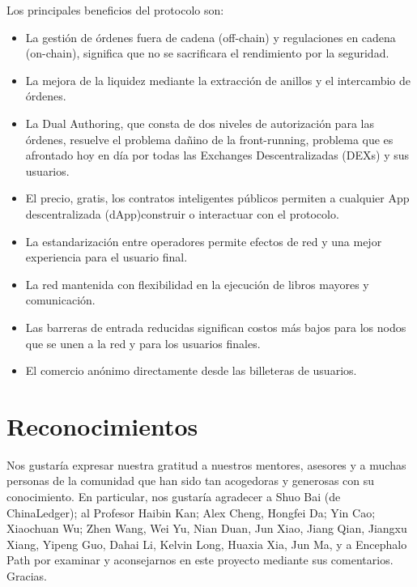 \documentclass[UTF8,nofonts]{article}
\begin{document}
\begin{multicols}{2}
Los principales beneficios del protocolo son:
\begin{itemize}
	\item La gesti\'on de \'ordenes fuera de cadena (off-chain) y regulaciones en cadena (on-chain), significa que no se sacrificara el rendimiento por la seguridad.
	\item La mejora de la liquidez mediante la extracci\'on de anillos y el intercambio de \'ordenes.
	\item La Dual Authoring, que consta de dos niveles de autorizaci\'on para las \'ordenes, resuelve el problema da\~nino de la front-running, problema que es afrontado hoy en d\'ia por todas las Exchanges Descentralizadas (DEXs) y sus usuarios.
	\item El precio, gratis, los contratos inteligentes p\'ublicos permiten a cualquier App descentralizada (dApp)construir o interactuar con el protocolo.
	\item La estandarizaci\'on entre operadores permite efectos de red y una mejor experiencia para el usuario final.
	\item La red mantenida con flexibilidad en la ejecuci\'on de libros mayores y comunicaci\'on.
	\item Las barreras de entrada reducidas significan costos m\'as bajos para los nodos que se unen a la red y para los usuarios finales.
	\item El comercio an\'onimo directamente desde las billeteras de usuarios.
\end{itemize}


\section{Reconocimientos}
Nos gustar\'ia expresar nuestra gratitud a nuestros mentores, asesores y a muchas personas de la comunidad que han sido tan acogedoras y generosas con su conocimiento. En particular, nos gustar\'ia agradecer a Shuo Bai (de ChinaLedger); al Profesor Haibin Kan; Alex Cheng, Hongfei Da; Yin Cao; Xiaochuan Wu; Zhen Wang, Wei Yu, Nian Duan, Jun Xiao, Jiang Qian, Jiangxu Xiang, Yipeng Guo, Dahai Li, Kelvin Long, Huaxia Xia, Jun Ma, y a Encephalo Path por examinar y aconsejarnos en este proyecto mediante sus comentarios. Gracias.





\end{multicols}
\end{document}

